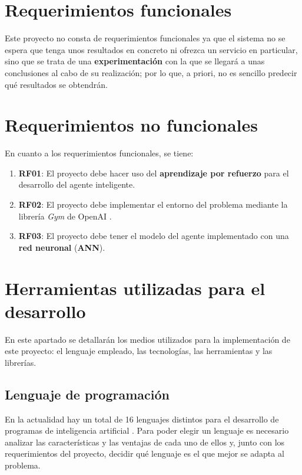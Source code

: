 \section{Requerimientos funcionales}

Este proyecto no consta de requerimientos funcionales ya que el sistema no se espera que tenga unos resultados en concreto ni ofrezca un servicio en particular, sino que se trata de una \textbf{experimentación} con la que se llegará a unas conclusiones al cabo de su realización; por lo que, a priori, no es sencillo predecir qué resultados se obtendrán. 
\section{Requerimientos no funcionales}

En cuanto a los requerimientos  funcionales, se tiene: 

\begin{enumerate} \label{requerimientos}
    \item \textbf{RF01}: El proyecto debe hacer uso del \textbf{aprendizaje por refuerzo} para el desarrollo del agente inteligente.
    \item \textbf{RF02}: El proyecto debe implementar el entorno del problema mediante la librería \textit{Gym} de OpenAI \cite{gymDocumentation}.
    \item \textbf{RF03}: El proyecto debe tener el modelo del agente implementado con una \textbf{red neuronal} (\textbf{ANN}).
\end{enumerate}

\section{Herramientas utilizadas para el desarrollo}

En este apartado se detallarán los medios utilizados para la implementación de este proyecto: el lenguaje empleado, las tecnologías, las herramientas y las librerías. 
\subsection{Lenguaje de programación} 

En la actualidad hay un total de 16 lenguajes distintos para el desarrollo de programas de inteligencia artificial \cite{wikiAILanguages}. Para poder elegir un lenguaje es necesario analizar las características y las ventajas de cada uno de ellos y, junto con los requerimientos del proyecto, decidir qué lenguaje es el que mejor se adapta al problema. \\

